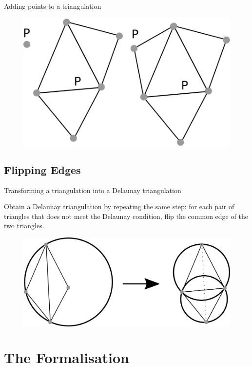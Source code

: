 \documentclass[18pt]{beamer}
\begin{document}
\begin{frame}{Adding points to a triangulation}
\begin{overprint}
  \begin{figure}
\centering
\includegraphics[scale=0.8]{adding3}
\end{figure}

\end{overprint}


\end{frame}


\subsection{Flipping Edges}
\begin{frame}{Transforming a triangulation into a Delaunay triangulation}

Obtain a Delaunay triangulation by repeating the same step: for each pair of triangles that does not meet the Delaunay condition, flip the common edge of the two triangles.

\begin{figure}
\centering
\includegraphics[scale=1]{dessin1}
\end{figure}
 
\end{frame}


\section{The Formalisation}
\end{document}
